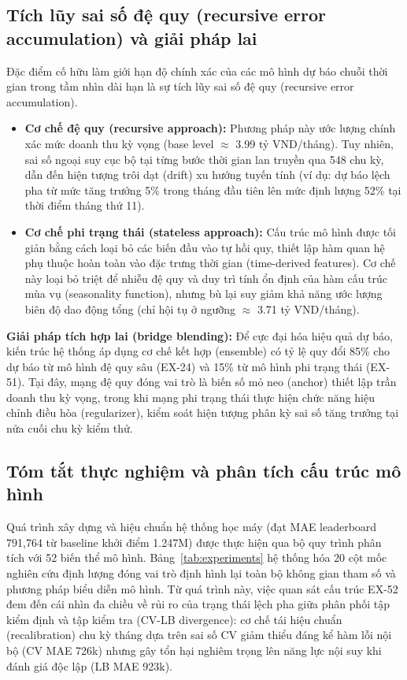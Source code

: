 \documentclass{article}
\begin{document}
\subsection{Tích lũy sai số đệ quy (recursive error accumulation) và giải pháp lai}
Đặc điểm cố hữu làm giới hạn độ chính xác của các mô hình dự báo chuỗi thời gian trong tầm nhìn dài hạn là sự tích lũy sai số đệ quy (recursive error accumulation). 
\begin{itemize}[noitemsep,leftmargin=1.2em]
    \item \textbf{Cơ chế đệ quy (recursive approach):} Phương pháp này ước lượng chính xác mức doanh thu kỳ vọng (base level $\approx$ 3.99 tỷ VND/tháng). Tuy nhiên, sai số ngoại suy cục bộ tại từng bước thời gian lan truyền qua 548 chu kỳ, dẫn đến hiện tượng trôi dạt (drift) xu hướng tuyến tính (ví dụ: dự báo lệch pha từ mức tăng trưởng 5\% trong tháng đầu tiên lên mức định lượng 52\% tại thời điểm tháng thứ 11).
    \item \textbf{Cơ chế phi trạng thái (stateless approach):} Cấu trúc mô hình được tối giản bằng cách loại bỏ các biến đầu vào tự hồi quy, thiết lập hàm quan hệ phụ thuộc hoàn toàn vào đặc trưng thời gian (time-derived features). Cơ chế này loại bỏ triệt để nhiễu đệ quy và duy trì tính ổn định của hàm cấu trúc mùa vụ (seasonality function), nhưng bù lại suy giảm khả năng ước lượng biên độ dao động tổng (chỉ hội tụ ở ngưỡng $\approx$ 3.71 tỷ VND/tháng).
\end{itemize}
\textbf{Giải pháp tích hợp lai (bridge blending):} Để cực đại hóa hiệu quả dự báo, kiến trúc hệ thống áp dụng cơ chế kết hợp (ensemble) có tỷ lệ quy đổi 85\% cho dự báo từ mô hình đệ quy sâu (EX-24) và 15\% từ mô hình phi trạng thái (EX-51). Tại đây, mạng đệ quy đóng vai trò là biến số mỏ neo (anchor) thiết lập trần doanh thu kỳ vọng, trong khi mạng phi trạng thái thực hiện chức năng hiệu chỉnh điều hòa (regularizer), kiểm soát hiện tượng phân kỳ sai số tăng trưởng tại nửa cuối chu kỳ kiểm thử.

\subsection{Tóm tắt thực nghiệm và phân tích cấu trúc mô hình}
Quá trình xây dựng và hiệu chuẩn hệ thống học máy (đạt MAE leaderboard 791,764 từ baseline khởi điểm 1.247M) được thực hiện qua bộ quy trình phân tích với 52 biến thể mô hình. Bảng~\ref{tab:experiments} hệ thống hóa 20 cột mốc nghiên cứu định lượng đóng vai trò định hình lại toàn bộ không gian tham số và phương pháp biểu diễn mô hình. Từ quá trình này, việc quan sát cấu trúc EX-52 đem đến cái nhìn đa chiều về rủi ro của trạng thái lệch pha giữa phân phối tập kiểm định và tập kiểm tra (CV-LB divergence): cơ chế tái hiệu chuẩn (recalibration) chu kỳ tháng dựa trên sai số CV giảm thiểu đáng kể hàm lỗi nội bộ (CV MAE 726k) nhưng gây tổn hại nghiêm trọng lên năng lực nội suy khi đánh giá độc lập (LB MAE 923k).
\end{document}
